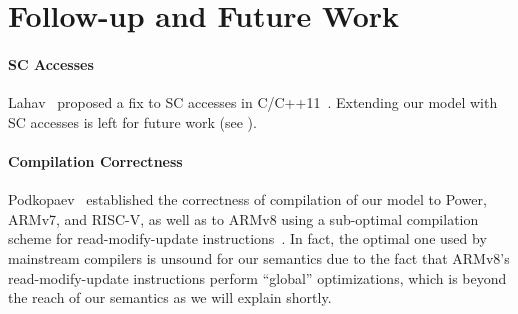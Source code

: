 \section{Follow-up and Future Work}\label{sec:discussion}


\paragraph{SC Accesses}

Lahav~\etal{} proposed a fix to SC accesses in C/C++11~\cite{rc11}.  Extending our model with SC
accesses is left for future work (see ).



\paragraph{Compilation Correctness}

Podkopaev~\etal{} established the correctness of compilation of our model to Power, ARMv7, and
RISC-V, as well as to ARMv8 using a sub-optimal compilation scheme for read-modify-update
instructions~\cite{imm-compilation}.  In fact, the optimal one used by mainstream compilers is
unsound for our semantics due to the fact that ARMv8's read-modify-update instructions perform
``global'' optimizations, which is beyond the reach of our semantics as we will explain shortly.





